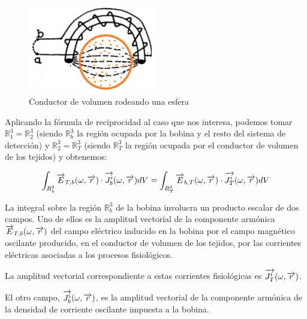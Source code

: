 \begin{figure}[H]
    \centering
    \includegraphics[width=0.5\textwidth]{./Figures/fig615}
	\caption{Conductor de volumen rodeando una esfera}
	\label{fig:615}
\end{figure}

Aplicando la fórmula de reciprocidad al caso que nos interesa, podemos tomar $\mathbb{R}^{3}_{1}=\mathbb{R}^{3}_{2}$ (siendo $\mathbb{R}^{3}_{b}$ la región ocupada por la bobina y el resto del sistema de detección) y $\mathbb{R}^{3}_{2} = \mathbb{R}^{3}_{T}$ (siendo $\mathbb{R}^{3}_{T}$ la región ocupada por el conductor de volumen de los tejidos) y obtenemos:

\begin{equation}
	\int_{R^{3}_{b}}\overrightarrow{E}_{T,b}(\omega,\overrightarrow{r}) \cdot \overrightarrow{J_{b}^{i}}(\omega,\overrightarrow{r}) dV = 
	\int_{R^{3}_{T}}\overrightarrow{E}_{b,T}(\omega,\overrightarrow{r}) \cdot \overrightarrow{J_{T}^{i}}(\omega,\overrightarrow{r}) dV
\end{equation}

La integral sobre la región $\mathbb{R}^{3}_{b}$ de la bobina involucra un producto escalar de dos campos. Uno de ellos es la amplitud vectorial de la componente armónica $\overrightarrow{E}_{T,b}(\omega,\overrightarrow{r})$ del campo eléctrico inducido en la bobina por el campo magnético oscilante producido, en el conductor de volumen de los tejidos, por las corrientes eléctricas asociadas a los procesos fisiológicos.

La amplitud vectorial correspondiente a estas corrientes fisiológicas es $\overrightarrow{J_{T}^{i}}(\omega,\overrightarrow{r})$.

El otro campo, $\overrightarrow{J_{b}^{i}}(\omega,\overrightarrow{r})$, es la amplitud vectorial de la componente armónica de la densidad de corriente oscilante impuesta a la bobina.

